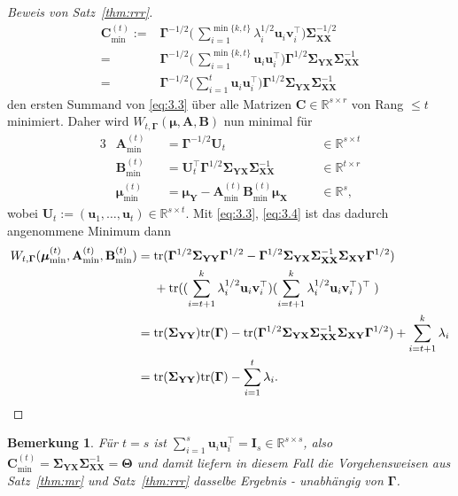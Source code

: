 \documentclass[]{article}
\newcommand{\R}{\mathbb{R}}
\newcommand{\X}{\mathbf{X}}
\newcommand{\Y}{\mathbf{Y}}
\newcommand{\T}{\mathbf{\Theta}}
\newcommand{\muu}{\bm{\mu}}
\newcommand{\Ssigma}{\mathbf{\Sigma}}
\newcommand{\vv}{\mathbf{v}}
\newcommand{\uu}{\mathbf{u}}
\newcommand{\C}{\mathbf{C}}
\newcommand{\A}{\mathbf{A}}
\newcommand{\B}{\mathbf{B}}
\newcommand{\Ggamma}{\mathbf{\Gamma}}
\newcommand{\tr}{\mathrm{tr}}
\newtheorem*{remark}{Bemerkung}
\begin{document}
\begin{proof}[Beweis von Satz~\ref{thm:rrr}]
\begin{align*}
		\C^{(t)}_{\min} :={}& \Ggamma^{-1/2} \biggl( \, \sum_{i=1}^{\min\{k, t\}} \lambda_i^{1/2} \uu_i \vv_i^\top \biggr) \Ssigma_{\X\X}^{-1/2} \\
		                 ={}& \Ggamma^{-1/2} \biggl( \, \sum_{i=1}^{\min\{k, t\}} \uu_i \uu_i^\top \biggr) \Ggamma^{1/2} \Ssigma_{\Y\X} \Ssigma_{\X\X}^{-1} \\
		                 ={}& \Ggamma^{-1/2} \biggl( \sum_{i=1}^{t} \uu_i \uu_i^\top \biggr) \Ggamma^{1/2} \Ssigma_{\Y\X} \Ssigma_{\X\X}^{-1}
	\end{align*}
	den ersten Summand von \eqref{eq:3.3} über alle Matrizen $\C \in \R^{s \times r}$ von Rang $\leq t$ minimiert.
	Daher wird $W_{t, \Ggamma}(\muu, \A, \B)$ nun minimal für
	\begin{alignat*}{3}
		&\A^{(t)}_{\min}   &&= \Ggamma^{-1/2} \mathbf{U}_t                                       &&\quad \in \R^{s \times t} \\
		&\B^{(t)}_{\min}   &&= \mathbf{U}_t^\top \Ggamma^{1/2} \Ssigma_{\Y\X}\Ssigma_{\X\X}^{-1} &&\quad \in \R^{t \times r} \\
		&\muu^{(t)}_{\min} &&= \muu_\Y - \A^{(t)}_{\min} \B^{(t)}_{\min} \muu_\X                 &&\quad \in \R^s \text{,}
	\end{alignat*}
	wobei $\mathbf{U}_t := (\uu_1,\dots, \uu_t) \in \R^{s \times t}$.
	Mit \eqref{eq:3.3}, \eqref{eq:3.4} ist das dadurch angenommene Minimum dann
	\begin{align*}
		W_{t, \Ggamma}(\muu^{(t)}_{\min}, \A^{(t)}_{\min}, \B^{(t)}_{\min}) ={}& \tr( \Ggamma^{1/2} \Ssigma_{\Y\Y} \Ggamma^{1/2} - \Ggamma^{1/2} \Ssigma_{\Y\X} \Ssigma_{\X\X}^{-1} \Ssigma_{\X\Y} \Ggamma^{1/2}) \\
																			   &+ \tr( (\sum_{i=t+1}^{k} \lambda_i^{1/2} \uu_i \vv_i^\top) (\sum_{i=t+1}^{k} \lambda_i^{1/2} \uu_i \vv_i^\top)^\top \; ) \\
																			={}& \tr(\Ssigma_{\Y\Y}) \tr(\Ggamma) - \tr(\Ggamma^{1/2} \Ssigma_{\Y\X} \Ssigma_{\X\X}^{-1} \Ssigma_{\X\Y} \Ggamma^{1/2}) + \sum_{i=t+1}^{k} \lambda_i \\
																			={}& \tr(\Ssigma_{\Y\Y}) \tr(\Ggamma) - \sum_{i=1}^{t} \lambda_i	\text{.} \qedhere										
	\end{align*}
\end{proof}

\begin{remark} 
	\normalfont
		Für $t = s$ ist $\sum_{i=1}^{s} \uu_i \uu_i^\top = \mathbf{I}_s \in \R^{s \times s}$, also $\C^{(t)}_{\min} = \Ssigma_{\Y\X} \Ssigma_{\X\X}^{-1} = \T$ und damit liefern in diesem Fall die Vorgehensweisen aus Satz~\ref{thm:mr} und Satz~\ref{thm:rrr} dasselbe Ergebnis - unabhängig von $\Ggamma$.
\end{remark}
\end{document}

